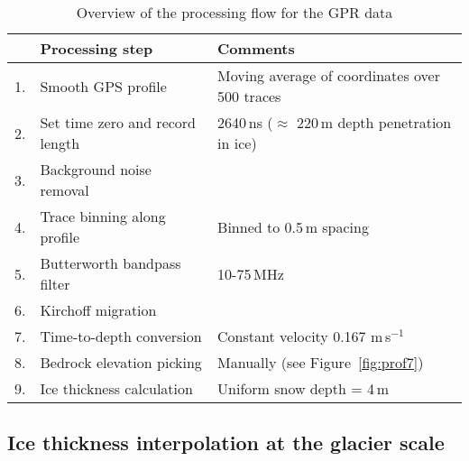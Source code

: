 \begin{table}[h!]
    \begin{center}
    \begin{tabular}{l l l}
        \hline
         \textbf{} & \textbf{Processing step} & \textbf{Comments} \\
         \hline 
         1. & Smooth GPS profile & Moving average of coordinates over 500 traces\\
         2. & Set time zero and record length & 2640\,ns ($\approx$ 220\,m depth penetration in ice)\\
         3. & Background noise removal &\\
         4. & Trace binning along profile & Binned to 0.5\,m spacing\\
         5. & Butterworth bandpass filter & 10-75\,MHz\\
         6. & Kirchoff migration &\\
         7. & Time-to-depth conversion & Constant velocity 0.167 m\,s$^{-1}$\\
         8. & Bedrock elevation picking & Manually (see Figure~\ref{fig:prof7})\\
         9. & Ice thickness calculation & Uniform snow depth = 4\,m\\
         \hline
    \end{tabular}
    \caption{Overview of the processing flow for the GPR data}
    \label{tab:processingflowGPR}
    \end{center}
\end{table}



\subsection{Ice thickness interpolation at the glacier scale}
\label{subsection:glate}

